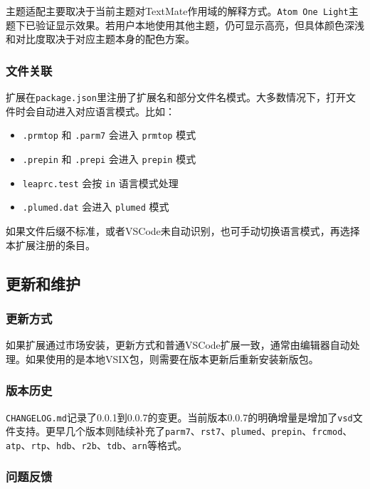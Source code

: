主题适配主要取决于当前主题对TextMate作用域的解释方式。\lstinline|Atom One Light|主题下已验证显示效果。若用户本地使用其他主题，仍可显示高亮，但具体颜色深浅和对比度取决于对应主题本身的配色方案。

\subsubsection{文件关联}

扩展在\lstinline|package.json|里注册了扩展名和部分文件名模式。大多数情况下，打开文件时会自动进入对应语言模式。比如：
\begin{itemize}
    \item \lstinline|.prmtop| 和 \lstinline|.parm7| 会进入 \lstinline|prmtop| 模式
    \item \lstinline|.prepin| 和 \lstinline|.prepi| 会进入 \lstinline|prepin| 模式
    \item \lstinline|leaprc.test| 会按 \lstinline|in| 语言模式处理
    \item \lstinline|.plumed.dat| 会进入 \lstinline|plumed| 模式
\end{itemize}

如果文件后缀不标准，或者VSCode未自动识别，也可手动切换语言模式，再选择本扩展注册的条目。

\subsection{更新和维护}

\subsubsection{更新方式}

如果扩展通过市场安装，更新方式和普通VSCode扩展一致，通常由编辑器自动处理。如果使用的是本地VSIX包，则需要在版本更新后重新安装新版包。

\subsubsection{版本历史}

\lstinline|CHANGELOG.md|记录了0.0.1到0.0.7的变更。当前版本0.0.7的明确增量是增加了\lstinline|vsd|文件支持。更早几个版本则陆续补充了\lstinline|parm7|、\lstinline|rst7|、\lstinline|plumed|、\lstinline|prepin|、\lstinline|frcmod|、\lstinline|atp|、\lstinline|rtp|、\lstinline|hdb|、\lstinline|r2b|、\lstinline|tdb|、\lstinline|arn|等格式。

\subsubsection{问题反馈}

